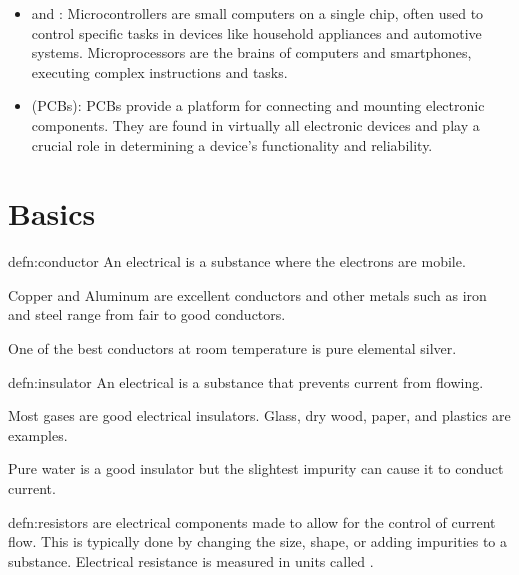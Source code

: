 \begin{itemize}
    \item {} and : Microcontrollers are small computers on a single chip, often used to control specific tasks in devices like household appliances and automotive systems. Microprocessors are the brains of computers and smartphones, executing complex instructions and tasks.

    \item {} (PCBs): PCBs provide a platform for connecting and mounting electronic components. They are found in virtually all electronic devices and play a crucial role in determining a device's functionality and reliability.
\end{itemize}


\section{Basics}

\begin{defn}[Conductors]{defn:conductor}
An electrical  is a substance where the electrons are mobile.
\end{defn}

Copper and Aluminum are excellent conductors and other metals such as iron and steel range from fair to good conductors.

\begin{interestnote}
One of the best conductors at room temperature is pure elemental silver. 
\end{interestnote}

\begin{defn}[Insulators]{defn:insulator}
An electrical  is a substance that prevents current from flowing.
\end{defn}

Most gases are good electrical insulators. Glass, dry wood, paper, and plastics are examples. 

\begin{interestnote}
Pure water is a good insulator but the slightest impurity can cause it to conduct current.
\end{interestnote}

\begin{defn}[Resistors]{defn:resistors}
 are electrical components made to allow for the control of current flow. This is typically done by changing the size, shape, or adding impurities to a substance. Electrical resistance is measured in units called .
\end{defn}

